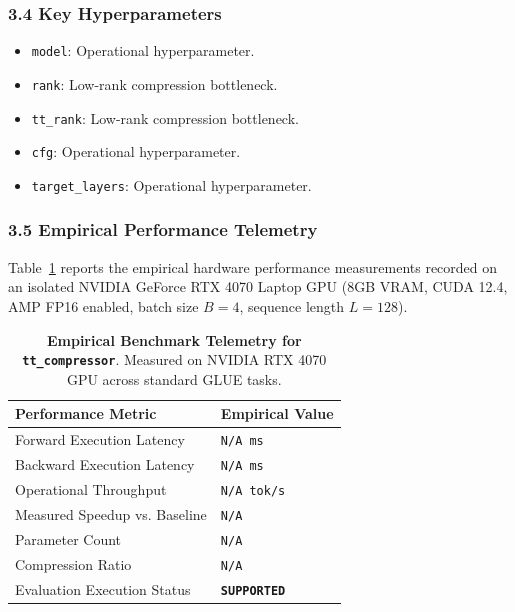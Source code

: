 \subsubsection*{3.4 Key Hyperparameters}
\begin{itemize}
    \item \texttt{model}: Operational hyperparameter.
    \item \texttt{rank}: Low-rank compression bottleneck.
    \item \texttt{tt\_rank}: Low-rank compression bottleneck.
    \item \texttt{cfg}: Operational hyperparameter.
    \item \texttt{target\_layers}: Operational hyperparameter.
\end{itemize}

\subsubsection*{3.5 Empirical Performance Telemetry}
Table~\ref{tab:telemetry_tt_compressor} reports the empirical hardware performance measurements recorded on an isolated NVIDIA GeForce RTX 4070 Laptop GPU (8GB VRAM, CUDA 12.4, AMP FP16 enabled, batch size $B=4$, sequence length $L=128$).

\begin{table}[h]
\centering
\small
\caption{\textbf{Empirical Benchmark Telemetry for \texttt{tt\_compressor}}. Measured on NVIDIA RTX 4070 GPU across standard GLUE tasks.}
\label{tab:telemetry_tt_compressor}
\begin{tabularx}{\columnwidth}{lX}
\toprule
\textbf{Performance Metric} & \textbf{Empirical Value} \\
\midrule
Forward Execution Latency & \texttt{N/A ms} \\
Backward Execution Latency & \texttt{N/A ms} \\
Operational Throughput & \texttt{N/A tok/s} \\
Measured Speedup vs. Baseline & \texttt{N/A} \\
Parameter Count & \texttt{N/A} \\
Compression Ratio & \texttt{N/A} \\
Evaluation Execution Status & \textbf{\texttt{SUPPORTED}} \\
\bottomrule
\end{tabularx}
\end{table}

